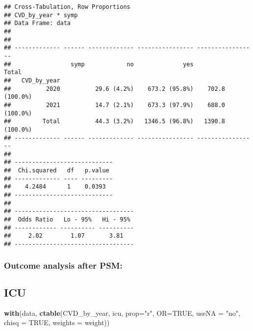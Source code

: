 \documentclass[
]{article}
\newenvironment{Shaded}{\begin{snugshade}}{\end{snugshade}}
\newcommand{\AttributeTok}[1]{\textcolor[rgb]{0.13,0.29,0.53}{#1}}
\newcommand{\ConstantTok}[1]{\textcolor[rgb]{0.56,0.35,0.01}{#1}}
\newcommand{\FunctionTok}[1]{\textcolor[rgb]{0.13,0.29,0.53}{\textbf{#1}}}
\newcommand{\NormalTok}[1]{#1}
\newcommand{\StringTok}[1]{\textcolor[rgb]{0.31,0.60,0.02}{#1}}
\begin{document}
\begin{verbatim}
## Cross-Tabulation, Row Proportions  
## CVD_by_year * symp  
## Data Frame: data  
## 
## 
## ------------- ------ ------------- ---------------- -----------------
##                 symp            no              yes             Total
##   CVD_by_year                                                        
##          2020          29.6 (4.2%)    673.2 (95.8%)    702.8 (100.0%)
##          2021          14.7 (2.1%)    673.3 (97.9%)    688.0 (100.0%)
##         Total          44.3 (3.2%)   1346.5 (96.8%)   1390.8 (100.0%)
## ------------- ------ ------------- ---------------- -----------------
## 
## ----------------------------
##  Chi.squared   df   p.value 
## ------------- ---- ---------
##    4.2484      1    0.0393  
## ----------------------------
## 
## ----------------------------------
##  Odds Ratio   Lo - 95%   Hi - 95% 
## ------------ ---------- ----------
##     2.02        1.07       3.81   
## ----------------------------------
\end{verbatim}

\hypertarget{outcome-analysis-after-psm}{%
\subsubsection{Outcome analysis after
PSM:}\label{outcome-analysis-after-psm}}

\hypertarget{icu-1}{%
\subsection{\texorpdfstring{{ ICU }}{ ICU }}\label{icu-1}}

\begin{Shaded}
\begin{Highlighting}[]
\FunctionTok{with}\NormalTok{(data, }\FunctionTok{ctable}\NormalTok{(CVD\_by\_year, icu, }\AttributeTok{prop=}\StringTok{"r"}\NormalTok{, }\AttributeTok{OR=}\ConstantTok{TRUE}\NormalTok{, }\AttributeTok{useNA =} \StringTok{"no"}\NormalTok{, }\AttributeTok{chisq =} \ConstantTok{TRUE}\NormalTok{,  }\AttributeTok{weights =}\NormalTok{ weight))}
\end{Highlighting}
\end{Shaded}
\end{document}
